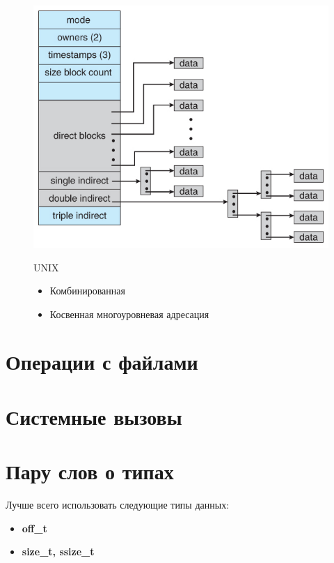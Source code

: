 \documentclass[../../lectures.tex]{subfiles}
\begin{document}
\begin{figure}[H]
\captionsetup{singlelinecheck=off}
\begin{minipage}[c]{0.5\linewidth}
\centering
\includegraphics[width=\textwidth]{images/unix-inode.jpg}
\end{minipage}
\hspace{0.5cm}
\begin{minipage}[c]{0.5\linewidth}
\centering
UNIX
\begin{itemize}
    \item Комбинированная
    \item Косвенная многоуровневая адресация
\end{itemize}
\end{minipage}
\end{figure}

\section{Операции с файлами}

\section{Системные вызовы}
\todo{}

\section{Пару слов о типах}
Лучше всего использовать следующие типы данных:
\begin{itemize}
    \item \textbf{off\_t}
    \item \textbf{size\_t, ssize\_t}
\end{itemize}
\end{document}
